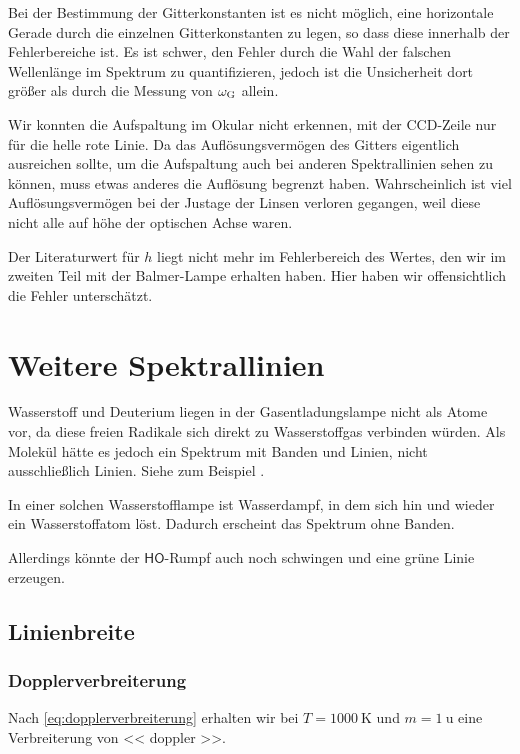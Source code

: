 Bei der Bestimmung der Gitterkonstanten ist es nicht möglich, eine horizontale
Gerade durch die einzelnen Gitterkonstanten zu legen, so dass diese innerhalb
der Fehlerbereiche ist. Es ist schwer, den Fehler durch die Wahl der falschen
Wellenlänge im Spektrum zu quantifizieren, jedoch ist die Unsicherheit dort
größer als durch die Messung von $\omega_\text G$ allein.

Wir konnten die Aufspaltung im Okular nicht erkennen, mit der CCD-Zeile nur für
die helle rote Linie. Da das Auflösungsvermögen des Gitters eigentlich
ausreichen sollte, um die Aufspaltung auch bei anderen Spektrallinien sehen zu
können, muss etwas anderes die Auflösung begrenzt haben. Wahrscheinlich ist
viel Auflösungsvermögen bei der Justage der Linsen verloren gegangen, weil
diese nicht alle auf höhe der optischen Achse waren.

Der Literaturwert für $h$ liegt nicht mehr im Fehlerbereich des Wertes, den wir
im zweiten Teil mit der Balmer-Lampe erhalten haben. Hier haben wir
offensichtlich die Fehler unterschätzt.

\section{Weitere Spektrallinien}

Wasserstoff und Deuterium liegen in der Gasentladungslampe nicht als Atome vor,
da diese freien Radikale sich direkt zu Wasserstoffgas verbinden würden. Als
Molekül hätte es jedoch ein Spektrum mit Banden und Linien, nicht
ausschließlich Linien. Siehe zum Beispiel
\cite[Abbildung~14.15]{meschede-gerthsen_24}.

In einer solchen Wasserstofflampe ist Wasserdampf, in dem sich hin und wieder
ein Wasserstoffatom löst. Dadurch erscheint das Spektrum ohne Banden.
\parencite[Abschnitt~2.1]{leybold/balmer_lampe}
\parencite{wikipedia/gas_discharge_lamp}

Allerdings könnte der $\mathrm{\mathsf{HO}}$-Rumpf auch noch schwingen und eine
grüne Linie erzeugen.

\subsection{Linienbreite}

\subsubsection{Dopplerverbreiterung}

Nach \eqref{eq:dopplerverbreiterung} erhalten wir bei $T = \SI{1000}{\kelvin}$
und $m = \SI{1}{\atomicmassunit}$ eine Verbreiterung von \num{<< doppler >>}.

